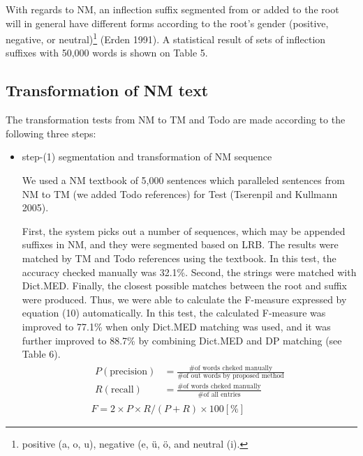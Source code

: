 \documentclass[english]{jnlp_1.4}
\begin{document}
With regards to NM, an inflection suffix segmented from or added to the root 
will in general have different forms according to the root's gender 
(positive, negative, or neutral)\footnote{positive (a, o, u), 
negative (e, \"{u}, \"{o}, and neutral (i).} (Erden 1991). A statistical 
result of sets of inflection suffixes with 50,000 words is shown on Table 5.


\subsection{Transformation of NM text}

The transformation tests from NM to TM and Todo are made according to the 
following three steps:

\begin{itemize}
\item
step-(1) segmentation and transformation of NM sequence

We used a NM textbook of 5,000 sentences which paralleled sentences from NM 
to TM (we added Todo references) for Test (Tserenpil and Kullmann 2005).

First, the system picks out a number of sequences, which may be appended 
suffixes in NM, and they were segmented based on LRB. The results were 
matched by TM and Todo references using the textbook. In this test, the 
accuracy checked manually was 32.1{\%}. Second, the strings were matched 
with Dict.MED. Finally, the closest possible matches between the root and 
suffix were produced. Thus, we were able to calculate the F-measure 
expressed by equation (10) automatically. In this test, the calculated 
F-measure was improved to 77.1{\%} when only Dict.MED matching was used, and 
it was further improved to 88.7{\%} by combining Dict.MED and DP matching 
(see Table 6).
\begin{gather}
 \begin{split}
  P(\mathrm{precision}) & =\frac{\# \text{of words cheked manually}}{\# \text{of out words by proposed method}} \\
  R(\mathrm{recall}) & =\frac{\# \text{of words cheked manually}}{\# \text{of all entries}}
 \end{split}\nonumber\\
 F=2 \times P \times R/(P+R) \times 100[\%]
\end{gather}

\begin{table}[b]
\caption{Test results of step-(1) whh}
\begin{center}

\end{center}
\end{table}



\end{itemize}
\end{document}

